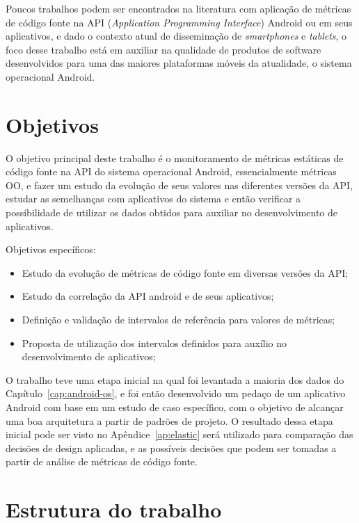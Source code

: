 Poucos trabalhos podem ser encontrados na literatura com aplicação de métricas de código fonte na API (\textit{Application Programming Interface}) Android ou em seus aplicativos, e dado o contexto atual de disseminação de \textit{smartphones} e \textit{tablets}, o foco desse trabalho está em auxiliar na qualidade de produtos de software desenvolvidos para uma das maiores plataformas móveis da atualidade, o sistema operacional Android. 

\section{Objetivos}

O objetivo principal deste trabalho é o monitoramento de métricas estáticas de código fonte na API do sistema operacional Android, essencialmente métricas OO, e fazer um estudo da evolução de seus valores nas diferentes versões da API, estudar as semelhanças com aplicativos do sistema e então verificar a possibilidade de utilizar os dados obtidos para auxiliar no desenvolvimento de aplicativos.

Objetivos específicos:
\begin{itemize}
\item Estudo da evolução de métricas de código fonte em diversas versões da API;
\item Estudo da correlação da API android e de seus aplicativos;
\item Definição e validação de intervalos de referência para valores de métricas;
\item Proposta de utilização dos intervalos definidos para auxílio no desenvolvimento de aplicativos;
\end{itemize}

O trabalho teve uma etapa inicial na qual foi levantada a maioria dos dados do Capítulo~\ref{cap:android-os}, e foi então desenvolvido um pedaço de um aplicativo Android com base em um estudo de caso específico, com o objetivo de alcançar uma boa arquitetura a partir de padrões de projeto. O resultado dessa etapa inicial pode ser visto no Apêndice~\ref{ap:elastic} será utilizado para comparação das decisões de design aplicadas, e as possíveis decisões que podem ser tomadas a partir de análise de métricas de código fonte.

\section{Estrutura do trabalho}

